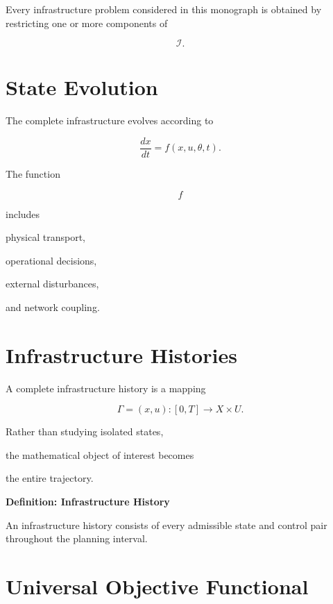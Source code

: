 \documentclass[11pt,fleqn]{book}
\numberwithin{equation}{chapter}
\newenvironment{definition}[1]
  {\begin{definitionEnv}
   \noindent\textbf{Definition: #1}\par\smallskip}
  {\end{definitionEnv}}
\theoremstyle{plain}
\theoremstyle{definition}
\theoremstyle{remark}
\begin{document}
Every infrastructure problem considered in this monograph is obtained by
restricting one or more components of

\[
\mathcal I.
\]


\section{State Evolution}

The complete infrastructure evolves according to

\[
\boxed{
\frac{dx}{dt}
=
f(x,u,\theta,t).
}
\]

The function

\[
f
\]

includes

physical transport,

operational decisions,

external disturbances,

and network coupling.


\section{Infrastructure Histories}

A complete infrastructure history is a mapping

\[
\Gamma
=
(x,u):
[0,T]
\rightarrow
X\times U.
\]

Rather than studying isolated states,

the mathematical object of interest becomes

the entire trajectory.


\begin{definition}{Infrastructure History}

An infrastructure history consists of every admissible state and control
pair throughout the planning interval.

\end{definition}


\section{Universal Objective Functional}
\end{document}
